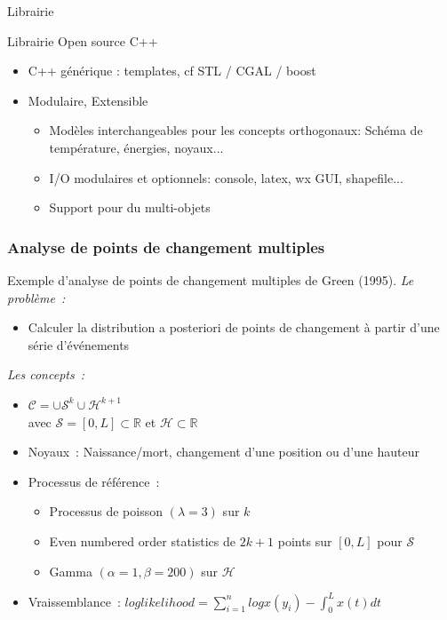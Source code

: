 \documentclass{beamer}
\begin{document}
\begin{frame}{Librairie}
\begin{block}{Librairie Open source C++}
\begin{itemize}
\item C++ générique : templates, cf  STL / CGAL / boost\\
\item Modulaire, Extensible
\begin{itemize}
 \item Modèles interchangeables pour les concepts orthogonaux: Schéma de température, énergies, noyaux...
 \item I/O modulaires et optionnels: console, latex, wx GUI, shapefile...
 \item Support pour du multi-objets
\end{itemize}
\end{itemize}
\end{block}

\end{frame}


\begin{frame}
\frametitle{Analyse de points de changement multiples}
Exemple d'analyse de points de changement multiples de Green (1995).
\emph{Le probl\`eme~:} 
\begin{itemize}
\item Calculer la distribution a posteriori de points de changement à partir d'une série d'événements
\end{itemize}
\emph{Les concepts~:}
\begin{itemize}
\item $\mathcal{C} = \cup\mathcal{S}^k \cup\mathcal{H}^{k+1}$\\
avec $\mathcal{S}=[0,L] \subset \mathds{R}$ et $\mathcal{H} \subset \mathds{R}$
\item Noyaux~: Naissance/mort, changement d'une position ou d'une hauteur
\item Processus de référence~:
\begin{itemize}
\item Processus de poisson $(\lambda = 3)$ sur $k$
\item Even numbered order statistics de $2k+1$ points sur $[0,L]$ pour $\mathcal{S}$
\item Gamma $(\alpha = 1,\beta = 200)$ sur $\mathcal{H}$
\end{itemize}
\item Vraissemblance~: $log likelihood = \displaystyle\sum_{i=1}^n log {x(y_i)} - \int_0^L x(t)dt$
\end{itemize}
\end{frame}
\end{document}
